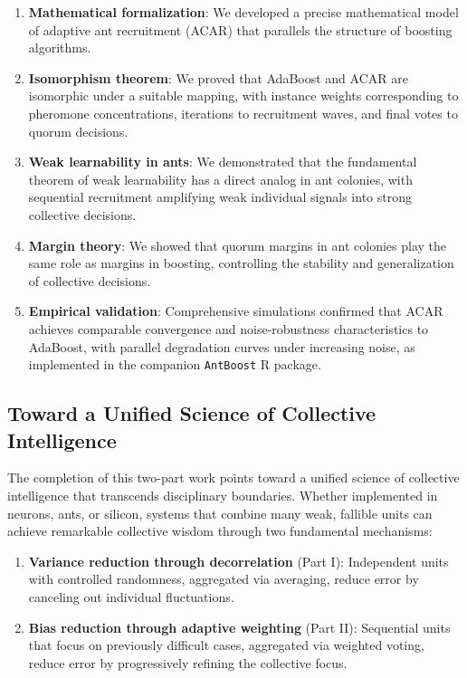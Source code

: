 \documentclass[12pt,letterpaper]{article}
\begin{document}
\begin{enumerate}
    \item \textbf{Mathematical formalization}: We developed a precise mathematical model of adaptive ant recruitment (ACAR) that parallels the structure of boosting algorithms.
    
    \item \textbf{Isomorphism theorem}: We proved that AdaBoost and ACAR are isomorphic under a suitable mapping, with instance weights corresponding to pheromone concentrations, iterations to recruitment waves, and final votes to quorum decisions.
    
    \item \textbf{Weak learnability in ants}: We demonstrated that the fundamental theorem of weak learnability has a direct analog in ant colonies, with sequential recruitment amplifying weak individual signals into strong collective decisions.
    
    \item \textbf{Margin theory}: We showed that quorum margins in ant colonies play the same role as margins in boosting, controlling the stability and generalization of collective decisions.
    
    \item \textbf{Empirical validation}: Comprehensive simulations confirmed that ACAR achieves comparable convergence and noise-robustness characteristics to AdaBoost, with parallel degradation curves under increasing noise, as implemented in the companion \texttt{AntBoost} R package.
\end{enumerate}

\subsection{Toward a Unified Science of Collective Intelligence}

The completion of this two-part work points toward a unified science of collective intelligence that transcends disciplinary boundaries. Whether implemented in neurons, ants, or silicon, systems that combine many weak, fallible units can achieve remarkable collective wisdom through two fundamental mechanisms:

\begin{enumerate}
    \item \textbf{Variance reduction through decorrelation} (Part I): Independent units with controlled randomness, aggregated via averaging, reduce error by canceling out individual fluctuations.
    
    \item \textbf{Bias reduction through adaptive weighting} (Part II): Sequential units that focus on previously difficult cases, aggregated via weighted voting, reduce error by progressively refining the collective focus.
\end{enumerate}
\end{document}
